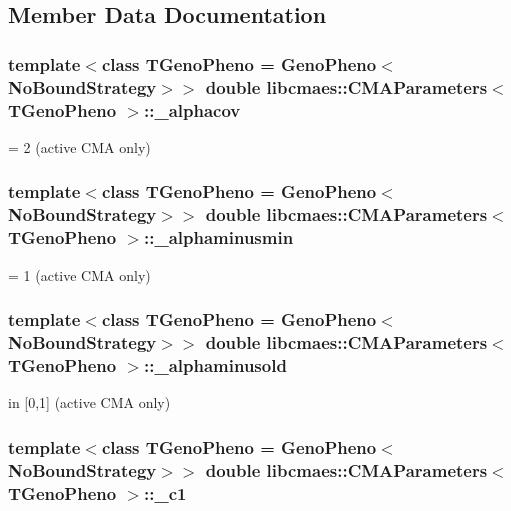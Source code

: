 \subsection{Member Data Documentation}
\hypertarget{classlibcmaes_1_1CMAParameters_ae13b411e5035c574e1521afa4b6d734b}{
\subsubsection[{\-\_\-alphacov}]{\setlength{\rightskip}{0pt plus 5cm}template$<$class T\-Geno\-Pheno = Geno\-Pheno$<$\-No\-Bound\-Strategy$>$$>$ double {\bf libcmaes\-::\-C\-M\-A\-Parameters}$<$ T\-Geno\-Pheno $>$\-::\-\_\-alphacov}}\label{classlibcmaes_1_1CMAParameters_ae13b411e5035c574e1521afa4b6d734b}
= 2 (active C\-M\-A only) \hypertarget{classlibcmaes_1_1CMAParameters_a8d4e4afdbdb72635241846562fc37a04}{
\subsubsection[{\-\_\-alphaminusmin}]{\setlength{\rightskip}{0pt plus 5cm}template$<$class T\-Geno\-Pheno = Geno\-Pheno$<$\-No\-Bound\-Strategy$>$$>$ double {\bf libcmaes\-::\-C\-M\-A\-Parameters}$<$ T\-Geno\-Pheno $>$\-::\-\_\-alphaminusmin}}\label{classlibcmaes_1_1CMAParameters_a8d4e4afdbdb72635241846562fc37a04}
= 1 (active C\-M\-A only) \hypertarget{classlibcmaes_1_1CMAParameters_a3dfb7a180cb3746a4bc3a2d82b8a8f35}{
\subsubsection[{\-\_\-alphaminusold}]{\setlength{\rightskip}{0pt plus 5cm}template$<$class T\-Geno\-Pheno = Geno\-Pheno$<$\-No\-Bound\-Strategy$>$$>$ double {\bf libcmaes\-::\-C\-M\-A\-Parameters}$<$ T\-Geno\-Pheno $>$\-::\-\_\-alphaminusold}}\label{classlibcmaes_1_1CMAParameters_a3dfb7a180cb3746a4bc3a2d82b8a8f35}
in \mbox{[}0,1\mbox{]} (active C\-M\-A only) \hypertarget{classlibcmaes_1_1CMAParameters_ad6c921f865fc7fc344e8e1408baca772}{
\subsubsection[{\-\_\-c1}]{\setlength{\rightskip}{0pt plus 5cm}template$<$class T\-Geno\-Pheno = Geno\-Pheno$<$\-No\-Bound\-Strategy$>$$>$ double {\bf libcmaes\-::\-C\-M\-A\-Parameters}$<$ T\-Geno\-Pheno $>$\-::\-\_\-c1}}\label{classlibcmaes_1_1CMAParameters_ad6c921f865fc7fc344e8e1408baca772}
